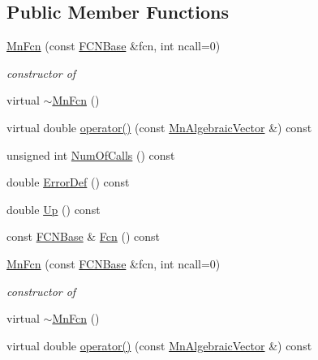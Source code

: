 \subsection*{Public Member Functions}
\begin{DoxyCompactItemize}
\item 
\mbox{\hyperlink{classROOT_1_1Minuit2_1_1MnFcn_a882c5c26556515b2bbe0d07f50b32f4f}{Mn\+Fcn}} (const \mbox{\hyperlink{classROOT_1_1Minuit2_1_1FCNBase}{F\+C\+N\+Base}} \&fcn, int ncall=0)
\begin{DoxyCompactList}\small\item\em constructor of \end{DoxyCompactList}\item 
virtual \mbox{\hyperlink{classROOT_1_1Minuit2_1_1MnFcn_a5b9ed490eb8084814d0b8e4d76c61adc}{$\sim$\+Mn\+Fcn}} ()
\item 
virtual double \mbox{\hyperlink{classROOT_1_1Minuit2_1_1MnFcn_a61a5f3cd53f1d7daa96bae19f4b1dbb6}{operator()}} (const \mbox{\hyperlink{namespaceROOT_1_1Minuit2_a62ed97730a1ca8d3fbaec64a19aa11c9}{Mn\+Algebraic\+Vector}} \&) const
\item 
unsigned int \mbox{\hyperlink{classROOT_1_1Minuit2_1_1MnFcn_af8dc896f10dc8a53429260198cd0e1c5}{Num\+Of\+Calls}} () const
\item 
double \mbox{\hyperlink{classROOT_1_1Minuit2_1_1MnFcn_abca32e4dd5ef187be7e099df14b4b54a}{Error\+Def}} () const
\item 
double \mbox{\hyperlink{classROOT_1_1Minuit2_1_1MnFcn_a2c91d0dd77e9c913116fb84b6fe31633}{Up}} () const
\item 
const \mbox{\hyperlink{classROOT_1_1Minuit2_1_1FCNBase}{F\+C\+N\+Base}} \& \mbox{\hyperlink{classROOT_1_1Minuit2_1_1MnFcn_a667fd993a6bb4832e6e70b7eaaca9fa4}{Fcn}} () const
\item 
\mbox{\hyperlink{classROOT_1_1Minuit2_1_1MnFcn_a882c5c26556515b2bbe0d07f50b32f4f}{Mn\+Fcn}} (const \mbox{\hyperlink{classROOT_1_1Minuit2_1_1FCNBase}{F\+C\+N\+Base}} \&fcn, int ncall=0)
\begin{DoxyCompactList}\small\item\em constructor of \end{DoxyCompactList}\item 
virtual \mbox{\hyperlink{classROOT_1_1Minuit2_1_1MnFcn_af4e4b9979af77ae593ceea7e7db82e2d}{$\sim$\+Mn\+Fcn}} ()
\item 
virtual double \mbox{\hyperlink{classROOT_1_1Minuit2_1_1MnFcn_ad981818a8e3bba0ec2cb0300238a5610}{operator()}} (const \mbox{\hyperlink{namespaceROOT_1_1Minuit2_a62ed97730a1ca8d3fbaec64a19aa11c9}{Mn\+Algebraic\+Vector}} \&) const

\end{DoxyCompactItemize}
